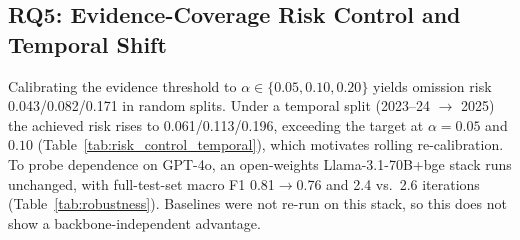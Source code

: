 \subsection{RQ5: Evidence-Coverage Risk Control and Temporal Shift}

Calibrating the evidence threshold to $\alpha\in\{0.05,0.10,0.20\}$ yields omission risk 0.043/0.082/0.171 in random splits. Under a temporal split (2023--24 $\rightarrow$ 2025) the achieved risk rises to 0.061/0.113/0.196, exceeding the target at $\alpha{=}0.05$ and $0.10$ (Table~\ref{tab:risk_control_temporal}), which motivates rolling re-calibration. To probe dependence on GPT-4o, an open-weights Llama-3.1-70B+bge stack runs unchanged, with full-test-set macro F1 0.81$\rightarrow$0.76 and 2.4 vs.\ 2.6 iterations (Table~\ref{tab:robustness}). Baselines were not re-run on this stack, so this does not show a backbone-independent advantage.
